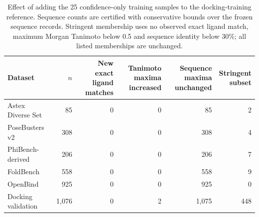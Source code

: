 \documentclass{article}
\begin{document}
\begin{table}[htbp]
    \centering
    \small
    \caption{Effect of adding the 25 confidence-only training samples to the docking-training reference. Sequence counts are certified with conservative bounds over the frozen sequence records. Stringent membership uses no observed exact ligand match, maximum Morgan Tanimoto below 0.5 and sequence identity below 30\%; all listed memberships are unchanged.}
    \label{tab:si_confidence_only_overlap}
    \begin{tabularx}{\linewidth}{@{}Xrrrrr@{}}
        \toprule
        Dataset & $n$ & \shortstack{New exact\\ligand matches} & \shortstack{Tanimoto maxima\\increased} & \shortstack{Sequence maxima\\unchanged} & \shortstack{Stringent\\subset} \\
        \midrule
        Astex Diverse Set & 85 & 0 & 0 & 85 & 2 \\
        PoseBusters v2 & 308 & 0 & 0 & 308 & 4 \\
        PhiBench-derived & 206 & 0 & 0 & 206 & 7 \\
        FoldBench & 558 & 0 & 0 & 558 & 9 \\
        OpenBind & 925 & 0 & 0 & 925 & 0 \\
        Docking validation & 1,076 & 0 & 2 & 1,075 & 448 \\
        \bottomrule
    \end{tabularx}
\end{table}
\end{document}
